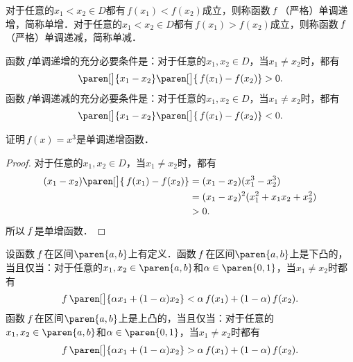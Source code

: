 \begin{definition}
  \label{defn:funcmono}
  对于任意的\(x_1 < x_2 \in D\)都有\(\,f(x_1) < f(x_2)\)成立，则称函数\(\,f\mkern2mu\)（严格）单调递增，简称单增．对于任意的\(x_1 < x_2 \in D\)都有\(\,f(x_1) > f(x_2)\)成立，则称函数\(\,f\mkern2mu\)（严格）单调递减，简称单减．
\end{definition}

\begin{theorem*}
  函数\(\,f\)单调递增的充分必要条件是：对于任意的\(x_1, x_2 \in D\)，当\(x_1 \ne x_2\)时，都有
  \begin{equation*}
    \paren[\big]{x_1 - x_2}\paren[\big]{\,f(x_1) - f(x_2)} > 0.
  \end{equation*}
  函数\(\,f\)单调递减的充分必要条件是：对于任意的\(x_1, x_2 \in D\)，当\(x_1 \ne x_2\)时，都有
  \begin{equation*}
    \paren[\big]{x_1 - x_2}\paren[\big]{\,f(x_1) - f(x_2)} < 0.
  \end{equation*}
\end{theorem*}

\begin{example*}
  证明\(\,f(x) = x^3\)是单调递增函数．

  \begin{proof}
    对于任意的\(x_1, x_2 \in D\)，当\(x_1 \ne x_2\)时，都有
    \[
      \begin{split}
        (x_1 - x_2) \paren[\big]{\,f(x_1) - f(x_2)}
        &= (x_1 - x_2) (x_1^3 - x_2^3) \\
        &= (x_1 - x_2)^2 (x_1^2 + x_1 x_2 + x_2^2) \\
        &> 0.
      \end{split}
    \]
    所以\(\,f\mkern2mu\)是单增函数．
  \end{proof}
\end{example*}

\begin{definition*}
  设函数\(\,f\mkern2mu\)在区间\(\paren{a,b}\)上有定义．函数\(\,f\mkern2mu\)在区间\(\paren{a,b}\)上是下凸的，当且仅当：对于任意的\(x_1, x_2 \in \paren{a,b}\)和\(\alpha \in \paren{0,1}\)，当\(x_1 \ne x_2\)时都有
  \[
    f\,\paren[\big]{\alpha x_1 + (1-\alpha) x_2} < \alpha\,f(x_1) + (1-\alpha)\,f(x_2).
  \]
  函数\(\,f\mkern2mu\)在区间\(\paren{a,b}\)上是上凸的，当且仅当：对于任意的\(x_1, x_2 \in \paren{a,b}\)和\(\alpha \in \paren{0,1}\)，当\(x_1 \ne x_2\)时都有
  \[
    f\,\paren[\big]{\alpha x_1 + (1-\alpha) x_2} > \alpha\,f(x_1) + (1-\alpha)\,f(x_2).
  \]
\end{definition*}

